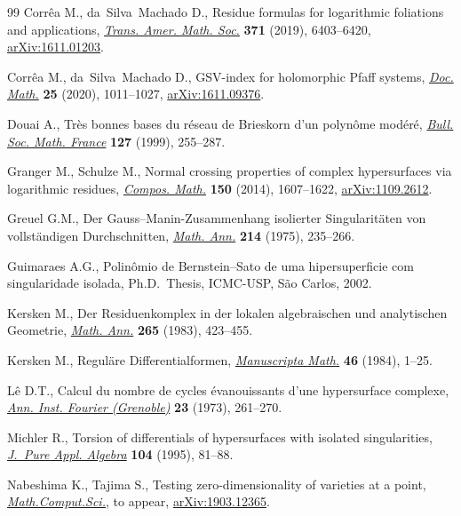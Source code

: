 \documentclass[pdftex]{sigma}%
\numberwithin{equation}{section}
\begin{document}
\begin{thebibliography}{99}
Corr\^ea M., da~Silva~Machado D., Residue formulas for logarithmic foliations
 and applications, \href{https://doi.org/10.1090/tran/7584}{\textit{Trans. Amer. Math. Soc.}} \textbf{371} (2019),
 6403--6420, \href{https://arxiv.org/abs/1611.01203}{arXiv:1611.01203}.

Corr\^ea M., da~Silva~Machado D., G{SV}-index for holomorphic {P}faff systems,
 \href{https://doi.org/10.25537/dm.2020v25.1011-1027}{\textit{Doc. Math.}} \textbf{25} (2020), 1011--1027, \href{https://arxiv.org/abs/1611.09376}{arXiv:1611.09376}.

Douai A., Tr\`es bonnes bases du r\'eseau de {B}rieskorn d'un polyn\^ome
 mod\'er\'e, \href{https://doi.org/10.24033/bsmf.2348}{\textit{Bull. Soc. Math. France}} \textbf{127} (1999), 255--287.

Granger M., Schulze M., Normal crossing properties of complex hypersurfaces via
 logarithmic residues, \href{https://doi.org/10.1112/S0010437X13007860}{\textit{Compos. Math.}} \textbf{150} (2014), 1607--1622,
 \href{https://arxiv.org/abs/1109.2612}{arXiv:1109.2612}.

Greuel G.M., Der {G}auss--{M}anin-{Z}usammenhang isolierter {S}ingularit\"aten
 von vollst\"andigen {D}urchschnitten, \href{https://doi.org/10.1007/BF01352108}{\textit{Math. Ann.}} \textbf{214}
 (1975), 235--266.

Guimaraes A.G., Polin\^omio de {B}ernstein--{S}ato de uma hipersuperficie com
 singularidade isolada, Ph.D.~Thesis, {I}CMC-{U}SP, S\~ao Carlos, 2002.

Kersken M., Der {R}esiduenkomplex in der lokalen algebraischen und analytischen
 {G}eometrie, \href{https://doi.org/10.1007/BF01455946}{\textit{Math. Ann.}} \textbf{265} (1983), 423--455.

Kersken M., Regul\"are {D}ifferentialformen, \href{https://doi.org/10.1007/BF01185193}{\textit{Manuscripta Math.}}
 \textbf{46} (1984), 1--25.

L\^e D.T., Calcul du nombre de cycles \'evanouissants d'une hypersurface
 complexe, \href{https://doi.org/10.5802/aif.491}{\textit{Ann. Inst. Fourier (Grenoble)}} \textbf{23} (1973),
 261--270.

Michler R., Torsion of differentials of hypersurfaces with isolated
 singularities, \href{https://doi.org/10.1016/0022-4049(94)00117-2}{\textit{J.~Pure Appl. Algebra}} \textbf{104} (1995), 81--88.

Nabeshima K., Tajima S., Testing zero-dimensionality of varieties at a point,
 \href{https://doi.org/10.1007/s11786-020-00484-y}{\textit{Math.Comput.Sci.}}, {t}o appear, \href{https://arxiv.org/abs/1903.12365}{arXiv:1903.12365}.


\end{thebibliography}
\end{document}

